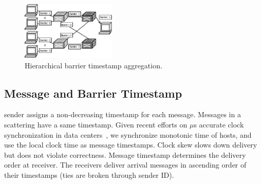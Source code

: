 



\begin{figure}[t]
	\centering
	\includegraphics[width=0.4\textwidth]{images/hierarchical_merge.pdf}
	\caption{Hierarchical barrier timestamp aggregation.} %
	\label{fig:hierarchical_merge}
\end{figure}


\subsection{Message and Barrier Timestamp}
\label{sec:loss-free}

\sys sender assigns a non-decreasing timestamp for each message. Messages in a scattering have a same timestamp.
Given recent efforts on $\mu$s accurate clock synchronization in data centers~\cite{correll2005design,lee2016globally,geng2018exploiting}, we synchronize monotonic time of hosts, and use the local clock time as message timestamps.
Clock skew slows down delivery but does not violate correctness.
Message timestamp determines the delivery order at receiver.
The receivers deliver arrival messages in ascending order of their timestamps (ties are broken through sender ID).

